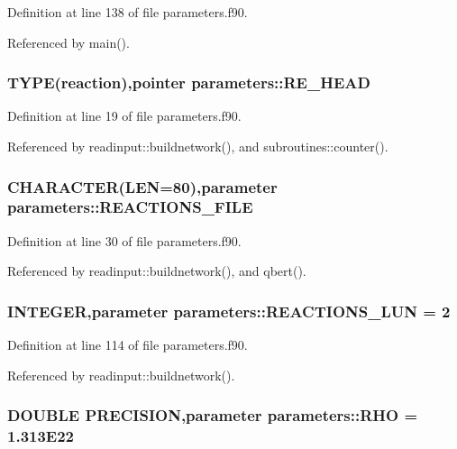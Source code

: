 Definition at line 138 of file parameters.f90.

Referenced by main().\hypertarget{namespaceparameters_aff68a046aeb1fa2a7610db8cd55922d8}{
\subsubsection[{RE\_\-HEAD}]{\setlength{\rightskip}{0pt plus 5cm}TYPE({\bf reaction}),pointer {\bf parameters::RE\_\-HEAD}}}
\label{namespaceparameters_aff68a046aeb1fa2a7610db8cd55922d8}


Definition at line 19 of file parameters.f90.

Referenced by readinput::buildnetwork(), and subroutines::counter().\hypertarget{namespaceparameters_a40ef599fa2e91d0f27cbd322f1270da8}{
\subsubsection[{REACTIONS\_\-FILE}]{\setlength{\rightskip}{0pt plus 5cm}CHARACTER(LEN=80),parameter {\bf parameters::REACTIONS\_\-FILE}}}
\label{namespaceparameters_a40ef599fa2e91d0f27cbd322f1270da8}


Definition at line 30 of file parameters.f90.

Referenced by readinput::buildnetwork(), and qbert().\hypertarget{namespaceparameters_a86efd37aa4980c19320f2996464f0a82}{
\subsubsection[{REACTIONS\_\-LUN}]{\setlength{\rightskip}{0pt plus 5cm}INTEGER,parameter {\bf parameters::REACTIONS\_\-LUN} = 2}}
\label{namespaceparameters_a86efd37aa4980c19320f2996464f0a82}


Definition at line 114 of file parameters.f90.

Referenced by readinput::buildnetwork().\hypertarget{namespaceparameters_ad8323286536365bb131984aa57af99df}{
\subsubsection[{RHO}]{\setlength{\rightskip}{0pt plus 5cm}DOUBLE PRECISION,parameter {\bf parameters::RHO} = 1.313E22}}
\label{namespaceparameters_ad8323286536365bb131984aa57af99df}


